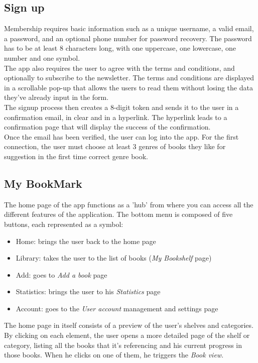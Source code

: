 \documentclass[conference]{IEEEtran}
\begin{document}
\subsection{Sign up}
Membership requires basic information such as a unique username, a valid email, a password, and an optional phone number for password recovery. The password has to be at least 8 characters long, with one uppercase, one lowercase, one number and one symbol.\\
The app also requires the user to agree with the terms and conditions, and optionally to subscribe to the newsletter. The terms and conditions are displayed in a scrollable pop-up that allows the users to read them without losing the data they've already input in the form.\\
The signup process then creates a 8-digit token and sends it to the user in a confirmation email, in clear and in a hyperlink. The hyperlink leads to a confirmation page that will display the success of the confirmation.\\
Once the email has been verified, the user can log into the app. For the first connection, the user must choose at least 3 genres of books they like for suggestion in the first time correct genre book.\\


\subsection{My BookMark}
The home page of the app functions as a 'hub' from where you can access all the different features of the application. The bottom menu is composed of five buttons, each represented as a symbol:
\begin{itemize}
	\item Home: brings the user back to the home page
	\item Library: takes the user to the list of books (\textit{My Bookshelf} page)
	\item Add: goes to \textit{Add a book} page
	\item Statistics: brings the user to his \textit{Statistics} page
	\item Account: goes to the \textit{User account} management and settings page
\end{itemize}

The home page in itself consists of a preview of the user's shelves and categories. By clicking on each element, the user opens a more detailed page of the shelf or category, listing all the books that it's referencing and his current progress in those books. When he clicks on one of them, he triggers the \textit{Book view}.\\
\end{document}
